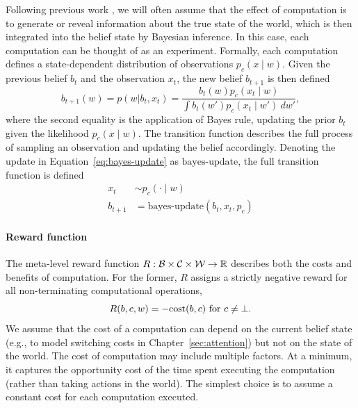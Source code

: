Following previous work \citep{matheson1968economic,hay2012selecting}, we will often assume that the effect of computation is to generate or reveal information about the true state of the world, which is then integrated into the belief state by Bayesian inference. In this case, each computation can be thought of as an experiment. Formally, each computation defines a state-dependent distribution of observations $p_c(x \mid w)$. Given the previous belief $b_t$ and the observation $x_t$, the new belief $b_{t+1}$ is then defined
%
\begin{equation}\label{eq:bayes-update}
  b_{t+1}(w) = p(w | b_t, x_t) = \frac{b_t(w) p_c(x_t \mid w)}{
    \displaystyle\int b_t(w') p_c(x_t \mid w') \ dw'
  },
\end{equation}
%
where the second equality is the application of Bayes rule, updating the prior $b_t$ given the likelihood $p_c(x \mid w)$. The transition function describes the full process of sampling an observation and updating the belief accordingly. Denoting the update in Equation~\ref{eq:bayes-update} as $\text{bayes-update}$, the full transition function is defined
%
\begin{align}
  x_t &\sim p_c(\cdot \mid w) \\
  b_{t+1} &= \text{bayes-update}(b_t, x_t, p_c)
\end{align}



\paragraph{Reward function}
The meta-level reward function $R: \mathcal{B} \times \mathcal{C} \times \mathcal{W} \rightarrow \mathbb{R}$ describes both the costs and benefits of computation. For the former, $R$ assigns a strictly negative reward for all non-terminating computational operations,
%
\begin{equation}
R(b, c, w) = -\text{cost}(b, c) \text{ for } c \neq \bot.
\end{equation}
%
We assume that the cost of a computation can depend on the current belief state (e.g., to model switching costs in Chapter~\ref{sec:attention}) but not on the state of the world. The cost of computation may include multiple factors. At a minimum, it captures the opportunity cost of the time spent executing the computation (rather than taking actions in the world). The simplest choice is to assume a constant cost for each computation executed.

